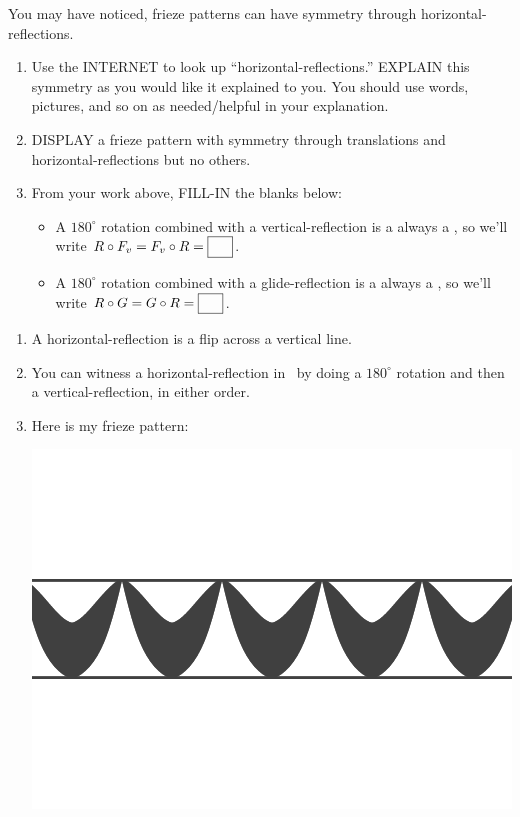 \documentclass[noauthor,nooutcomes,hints,handout]{../ximera}
\begin{document}
\begin{question}
  You may have noticed, frieze patterns can have symmetry through
  horizontal-reflections.
  \begin{enumerate}
  \item Use the INTERNET to look up ``horizontal-reflections.''
    EXPLAIN this symmetry as you would like it explained to you. You
    should use words, pictures, and so on as needed/helpful in your
    explanation.
  \item DISPLAY a frieze pattern with symmetry through translations
    and horizontal-reflections but no others.
  \item   From your work above, FILL-IN the blanks below:
  \begin{itemize}
  \item A $180^\circ$ rotation combined with a vertical-reflection
    is a always a \fbox{\phantom{horizontal-reflection}}, so we'll
    write $R\circ F_v = F_v \circ R = \fbox{\phantom{$F_h$}}$.
  \item A $180^\circ$ rotation combined with a glide-reflection
    is a always a \fbox{\phantom{horizontal-reflection}}, so we'll
    write $R\circ G = G \circ R = \fbox{\phantom{$F_h$}}$.
  \end{itemize}
  \end{enumerate}
  \begin{freeResponse}
    \begin{enumerate}
    \item A horizontal-reflection is a flip across a vertical line.
    \item You can witness a horizontal-reflection in \snap\ by doing a
      $180^\circ$ rotation and then a vertical-reflection, in either
      order.
    \item Here is my frieze pattern:
      \begin{center}
        \includegraphics[width=.6\textwidth]{ansFv.png}

\end{center}
\end{enumerate}
\end{freeResponse}
\end{question}
\end{document}
